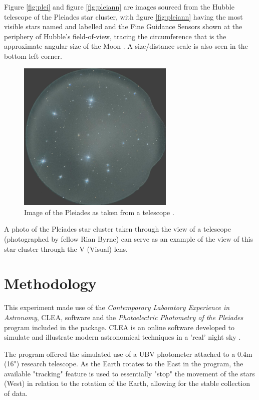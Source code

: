 \documentclass[12pt]{article}
\begin{document}
Figure \ref{fig:plei} and figure \ref{fig:pleiann} are images sourced from the Hubble telescope of the Pleiades star cluster, with figure \ref{fig:pleiann} having the most visible stars named and labelled
and the Fine Guidance Sensors shown at the periphery of Hubble's field-of-view, tracing the circumference that is the approximate angular size of the Moon \cite{pleiadesann}.
A size/distance scale is also seen in the bottom left corner.

\begin{figure}[H]
    \centering
    \includegraphics[width=7.5cm]{rian pleiades.jpg}
    \caption{\centering Image of the Pleiades as taken from a telescope \protect\cite{rian}.}
    \label{fig:visibleplei}
\end{figure}

A photo of the Pleiades star cluster taken through the view of a telescope (photographed by fellow Rian Byrne)\cite{rian} can serve as an example of the view of this star cluster through the V (Visual) lens.

\section{Methodology} \label{sec:2}

This experiment made use of the \textit{Contemporary Laboratory Experience in Astronomy}, CLEA, software and the \textit{Photoelectric Photometry of the Pleiades} program included in the package.
CLEA is an online software developed to simulate and illustrate modern astronomical techniques in a 'real' night sky
\cite{cleasm}.

The program offered the simulated use of a UBV photometer attached to a 0.4m (16") research telescope. As the Earth rotates to the East in the program, the available "tracking" feature is used to essentially "stop"
the movement of the stars (West) in relation to the rotation of the Earth, allowing for the stable collection of data.
\end{document}
